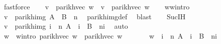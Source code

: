 \begin{isabellebody}
\ fastforce\isanewline
\ \ \isamarkupfalse%
\ {\isacharquery}{\kern0pt}v{}\ {\isacharequal}{\kern0pt}\ {\isachardoublequoteopen}parikh{\isacharunderscore}{\kern0pt}vec\ w{}{\isachardoublequoteclose}\ \ {\isacharquery}{\kern0pt}v{}\ {\isacharequal}{\kern0pt}\ {\isachardoublequoteopen}parikh{\isacharunderscore}{\kern0pt}vec\ w{}{\isachardoublequoteclose}\isanewline
\isanewline
\ \ \isamarkupfalse%
\ w{}{\isacharunderscore}{\kern0pt}w{}{\isacharunderscore}{\kern0pt}intro\ \isamarkupfalse%
\ {\isachardoublequoteopen}{\isacharquery}{\kern0pt}v{}\ {\isasymin}\ parikh{\isacharunderscore}{\kern0pt}img\ {\isacharparenleft}{\kern0pt}{\isacharparenleft}{\kern0pt}A\ {\isasymunion}\ B{\isacharparenright}{\kern0pt}\ {\isacharcircum}{\kern0pt}{\isacharcircum}{\kern0pt}\ n{\isacharparenright}{\kern0pt}{\isachardoublequoteclose}\ \isamarkupfalse%
\ parikh{\isacharunderscore}{\kern0pt}img{\isacharunderscore}{\kern0pt}def\ \isamarkupfalse%
\ blast\isanewline
\ \ \isamarkupfalse%
\ Suc{\isachardot}{\kern0pt}IH\ \isamarkupfalse%
\ {\isachardoublequoteopen}{\isacharquery}{\kern0pt}v{}\ {\isasymin}\ parikh{\isacharunderscore}{\kern0pt}img\ {\isacharparenleft}{\kern0pt}{\isasymUnion}i\ {\isasymle}\ n{\isachardot}{\kern0pt}\ A\ {\isacharcircum}{\kern0pt}{\isacharcircum}{\kern0pt}\ i\ {\isacharat}{\kern0pt}{\isacharat}{\kern0pt}\ B\ {\isacharcircum}{\kern0pt}{\isacharcircum}{\kern0pt}\ {\isacharparenleft}{\kern0pt}n{\isacharminus}{\kern0pt}i{\isacharparenright}{\kern0pt}{\isacharparenright}{\kern0pt}{\isachardoublequoteclose}\ \isamarkupfalse%
\ auto\isanewline
\ \ \isamarkupfalse%
\ \isamarkupfalse%
\ w{}{\isacharprime}{\kern0pt}\ \ w{}{\isacharprime}{\kern0pt}{\isacharunderscore}{\kern0pt}intro{\isacharcolon}{\kern0pt}\ {\isachardoublequoteopen}parikh{\isacharunderscore}{\kern0pt}vec\ w{}{\isacharprime}{\kern0pt}\ {\isacharequal}{\kern0pt}\ parikh{\isacharunderscore}{\kern0pt}vec\ w{}\ {\isasymand}\isanewline
\ \ \ \ \ \ w{}{\isacharprime}{\kern0pt}\ {\isasymin}\ {\isacharparenleft}{\kern0pt}{\isasymUnion}i\ {\isasymle}\ n{\isachardot}{\kern0pt}\ A\ {\isacharcircum}{\kern0pt}{\isacharcircum}{\kern0pt}\ i\ {\isacharat}{\kern0pt}{\isacharat}{\kern0pt}\ B\ {\isacharcircum}{\kern0pt}{\isacharcircum}{\kern0pt}\ {\isacharparenleft}{\kern0pt}n{\isacharminus}{\kern0pt}i{\isacharparenright}{\kern0pt}{\isacharparenright}{\kern0pt}{\isachardoublequoteclose}\ \isamarkupfalse%

\end{isabellebody}

